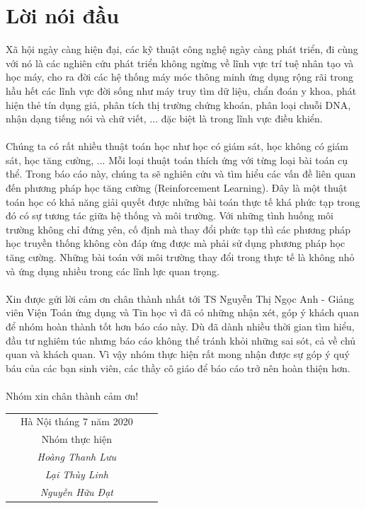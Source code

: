 \documentclass[12pt,a4paper]{report}
\begin{document}
\chapter*{Lời nói đầu}
Xã hội ngày càng hiện đại, các kỹ thuật công nghệ ngày càng phát triển, đi cùng với nó
là các nghiên cứu phát triển không ngừng về lĩnh vực trí tuệ nhân tạo và học máy, cho ra đời
các hệ thống máy móc thông minh ứng dụng rộng rãi trong hầu hết các lĩnh vực đời sống
như máy truy tìm dữ liệu, chẩn đoán y khoa, phát hiện thẻ tín dụng giả, phân tích thị trường
chứng khoán, phân loại chuỗi DNA, nhận dạng tiếng nói và chữ viết, ... đặc biệt là trong lĩnh vực điều khiển.\\\\
Chúng ta có rất nhiều thuật toán học như học có giám sát, học không có giám sát,
học tăng cường, ... Mỗi loại thuật toán thích ứng với từng loại bài toán cụ thể. Trong báo
cáo này, chúng ta sẽ nghiên cứu và tìm hiểu các vấn đề liên quan đến phương pháp học tăng
cường (Reinforcement Learning). Đây là một thuật toán học có khả năng giải quyết được
những bài toán thực tế khá phức tạp trong đó có sự tương tác giữa hệ thống và môi trường.
Với những tình huống môi trường không chỉ đứng yên, cố định mà thay đổi phức tạp thì các
phương pháp học truyền thống không còn đáp ứng được mà phải sử dụng phương pháp học
tăng cường. Những bài toán với môi trường thay đổi trong thực tế là không nhỏ và ứng dụng
nhiều trong các lĩnh lực quan trọng.\\\\
Xin được gửi lời cảm ơn chân thành nhất tới TS Nguyễn Thị Ngọc Anh - Giảng viên Viện Toán ứng dụng và Tin học vì đã có những nhận xét, góp ý khách quan để nhóm hoàn thành tốt hơn báo cáo này. Dù đã dành nhiều thời gian tìm hiểu, đầu tư nghiêm túc nhưng báo cáo không thể tránh khỏi những sai sót, cả về chủ quan và khách quan. Vì vậy nhóm thực hiện rất mong nhận được sự góp ý quý báu của các bạn sinh viên, các thầy cô giáo để báo cáo trở nên hoàn thiện hơn.\\\\ Nhóm xin chân thành cảm ơn!
\begin{flushright}
	\begin{tabular}{cccc}
		&  Hà Nội tháng  7 năm 2020 && \\ 
		&    Nhóm thực hiện && \\ &    \textit{Hoàng Thanh Lưu} && \\&    \textit{Lại Thùy Linh} && \\&   \textit{Nguyễn Hữu Đạt} && 
	\end{tabular} 
\end{flushright}
\tableofcontents
\end{document}
